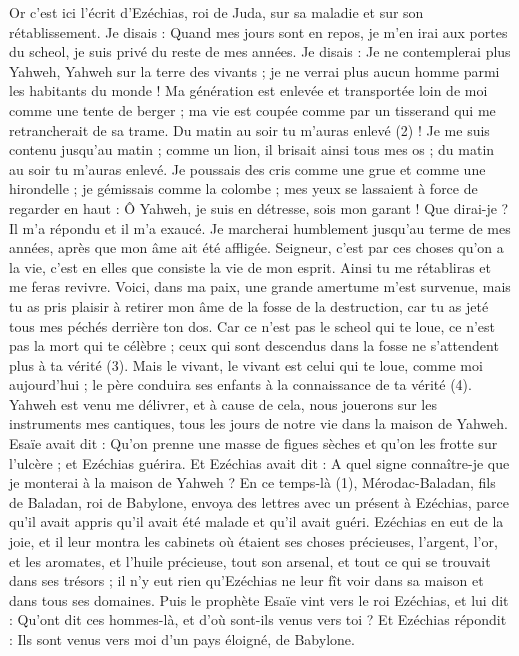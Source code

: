 \begin{multicols}{2}
Or c'est ici l'écrit d'Ezéchias, roi de Juda, sur sa maladie et sur son rétablissement.
Je disais : Quand mes jours sont en repos, je m'en irai aux portes du scheol, je suis privé du reste de mes années.
Je disais : Je ne contemplerai plus Yahweh, Yahweh sur la terre des vivants ; je ne verrai plus aucun homme parmi les habitants du monde !
Ma génération est enlevée et transportée loin de moi comme une tente de berger ; ma vie est coupée comme par un tisserand qui me retrancherait de sa trame. Du matin au soir tu m'auras enlevé (2) !
Je me suis contenu jusqu'au matin ; comme un lion, il brisait ainsi tous mes os ; du matin au soir tu m'auras enlevé.
Je poussais des cris comme une grue et comme une hirondelle ; je gémissais comme la colombe ; mes yeux se lassaient à force de regarder en haut : Ô Yahweh, je suis en détresse, sois mon garant !
Que dirai-je ? Il m'a répondu et il m’a exaucé. Je marcherai humblement jusqu’au terme de mes années, après que mon âme ait été affligée.
Seigneur, c’est par ces choses qu’on a la vie, c’est en elles que consiste la vie de mon esprit. Ainsi tu me rétabliras et me feras revivre.
Voici, dans ma paix, une grande amertume m’est survenue, mais tu as pris plaisir à retirer mon âme de la fosse de la destruction, car tu as jeté tous mes péchés derrière ton dos.
Car ce n’est pas le scheol qui te loue, ce n’est pas la mort qui te célèbre ; ceux qui sont descendus dans la fosse ne s'attendent plus à ta vérité (3).
Mais le vivant, le vivant est celui qui te loue, comme moi aujourd'hui ; le père conduira ses enfants à la connaissance de ta vérité (4).
Yahweh est venu me délivrer, et à cause de cela, nous jouerons sur les instruments mes cantiques, tous les jours de notre vie dans la maison de Yahweh.
Esaïe avait dit : Qu'on prenne une masse de figues sèches et qu'on les frotte sur l'ulcère ; et Ezéchias guérira.
Et Ezéchias avait dit : A quel signe connaître-je que je monterai à la maison de Yahweh ?
\VerseOne{}En ce temps-là (1), Mérodac-Baladan, fils de Baladan, roi de Babylone, envoya des lettres avec un présent à Ezéchias, parce qu'il avait appris qu'il avait été malade et qu'il avait guéri.
Ezéchias en eut de la joie, et il leur montra les cabinets où étaient ses choses précieuses, l'argent, l'or, et les aromates, et l’huile précieuse, tout son arsenal, et tout ce qui se trouvait dans ses trésors ; il n'y eut rien qu'Ezéchias ne leur fît voir dans sa maison et dans tous ses domaines.
Puis le prophète Esaïe vint vers le roi Ezéchias, et lui dit : Qu'ont dit ces hommes-là, et d'où sont-ils venus vers toi ? Et Ezéchias répondit : Ils sont venus vers moi d'un pays éloigné, de Babylone.

\end{multicols}
